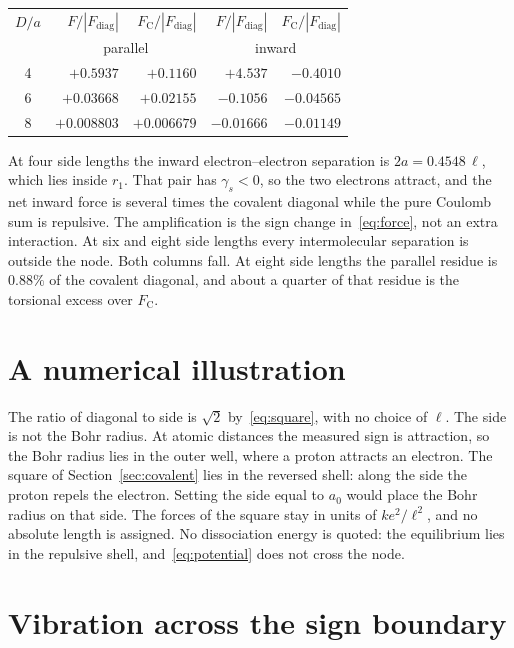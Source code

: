 \documentclass[a4paper]{article}
\begin{document}
\begin{center}
\begin{tabular}{crrrr}
\(D/a\) & \(F/|F_{\mathrm{diag}}|\) & \(F_{\mathrm{C}}/|F_{\mathrm{diag}}|\) & \(F/|F_{\mathrm{diag}}|\) & \(F_{\mathrm{C}}/|F_{\mathrm{diag}}|\) \\
 & \multicolumn{2}{c}{parallel} & \multicolumn{2}{c}{inward} \\
4 & \(+0.5937\) & \(+0.1160\) & \(+4.537\) & \(-0.4010\) \\
6 & \(+0.03668\) & \(+0.02155\) & \(-0.1056\) & \(-0.04565\) \\
8 & \(+0.008803\) & \(+0.006679\) & \(-0.01666\) & \(-0.01149\) \\
\end{tabular}
\end{center}

At four side lengths the inward electron--electron separation is \(2a=0.4548\,\ell\), which lies inside \(r_1\). That pair has \(\gamma_s<0\), so the two electrons attract, and the net inward force is several times the covalent diagonal while the pure Coulomb sum is repulsive. The amplification is the sign change in~\eqref{eq:force}, not an extra interaction. At six and eight side lengths every intermolecular separation is outside the node. Both columns fall. At eight side lengths the parallel residue is \(0.88\%\) of the covalent diagonal, and about a quarter of that residue is the torsional excess over \(F_{\mathrm{C}}\).

\section{A numerical illustration}
\label{sec:numbers}

The ratio of diagonal to side is \(\sqrt{2}\) by~\eqref{eq:square}, with no choice of \(\ell\). The side is not the Bohr radius. At atomic distances the measured sign is attraction, so the Bohr radius lies in the outer well, where a proton attracts an electron. The square of Section~\ref{sec:covalent} lies in the reversed shell: along the side the proton repels the electron. Setting the side equal to \(a_0\) would place the Bohr radius on that side. The forces of the square stay in units of \(k e^{2}/\ell^{2}\), and no absolute length is assigned. No dissociation energy is quoted: the equilibrium lies in the repulsive shell, and~\eqref{eq:potential} does not cross the node.

\section{Vibration across the sign boundary}
\label{sec:heat}
\end{document}
